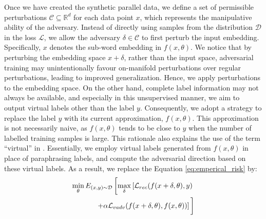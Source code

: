\documentclass[letterpaper]{article} %
\begin{document}
Once we have created the synthetic parallel data, we define a set of permissible perturbations $\mathcal{C} \subseteq \mathbb{R}^d$ for each data point $x$, which represents the manipulative ability of the adversary. Instead of directly using samples from the distribution $\mathcal{D}$ in the loss $\mathcal{L}$, we allow the adversary $\delta \in \mathcal{C}$ to first perturb the input embedding. Specifically, $x$ denotes the sub-word embedding in $f(x, \theta)$. We notice that by perturbing the embedding space $x + \delta$, rather than the input space, adversarial training may unintentionally favour on-manifold perturbations over regular perturbations, leading to improved generalization. Hence, we apply perturbations to the embedding space.  On the other hand, complete label information may not always be available, and especially in this unsupervised manner, we aim to output virtual labels other than the label $y$. Consequently, we adopt a strategy to replace the label $y$ with its current approximation, $f(x, \theta)$. This approximation is not necessarily naive, as $f(x, \theta)$ tends to be close to $y$ when the number of labelled training samples is large. This rationale also explains the use of the term ``virtual'' in \citet{miyato2018virtual}. Essentially, we employ virtual labels generated from $f(x, \theta)$ in place of paraphrasing labels, and compute the adversarial direction based on these virtual labels. As a result, we replace the Equation \ref{eq:emperical_risk} by:
\begin{equation}
    \begin{split}
        \min_{\theta}E_{(x,y)\sim \mathcal{D}} \left[ \max_{\delta} \left[ \mathcal{L}_{rec}(f(x + \delta,\theta), y) \right. \right. \\
        \left. \left. + \alpha \mathcal{L}_{vadv}(f(x+\delta,\theta),f(x,\theta))  \right] \vphantom{\max_{\delta}} \right]
    \end{split}
    \label{eq:vat_adv_emperical_risk}
\end{equation}
\end{document}
